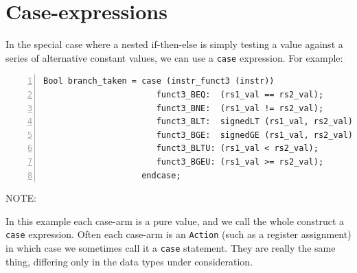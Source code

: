 
\section{Case-expressions}

\label{BSV_case_expressions}


In the special case where a nested if-then-else is simply testing a
value against a series of alternative constant values, we can use a
\verb|case| expression.  For example:

{\footnotesize
\begin{Verbatim}[frame=single, numbers=left, label=from src\_Common/Fn\_EX\_Control.bsv]
Bool branch_taken = case (instr_funct3 (instr))
                       funct3_BEQ:  (rs1_val == rs2_val);
                       funct3_BNE:  (rs1_val != rs2_val);
                       funct3_BLT:  signedLT (rs1_val, rs2_val);
                       funct3_BGE:  signedGE (rs1_val, rs2_val);
                       funct3_BLTU: (rs1_val < rs2_val);
                       funct3_BGEU: (rs1_val >= rs2_val);
                    endcase;
\end{Verbatim}
}


\vspace{1ex}

NOTE: 

\vspace{1ex}


In this example each case-arm is a pure value, and we call the whole
construct a \verb|case| expression.  Often each case-arm is an
\verb|Action| (such as a register assignment) in which case we
sometimes call it a \verb|case| statement.  They are really the same
thing, differing only in the data types under consideration.

\Beginexercise

